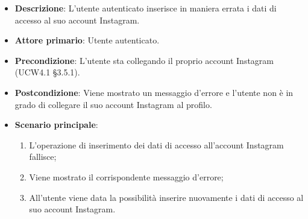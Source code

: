 \begin{itemize}
\item \textbf{Descrizione}: L'utente autenticato inserisce in maniera errata i dati di accesso al suo account Instagram.
\item \textbf{Attore primario}: Utente autenticato.
\item \textbf{Precondizione}: L'utente sta collegando il proprio account Instagram (UCW4.1 §3.5.1).
\item \textbf{Postcondizione}: Viene mostrato un messaggio d'errore e l'utente non è in grado di collegare il suo account Instagram al profilo.

\item \textbf{Scenario principale}:
\begin{enumerate}
\item L'operazione di inserimento dei dati di accesso all'account Instagram fallisce;
\item Viene mostrato il corrispondente messaggio d'errore;
\item All'utente viene data la possibilità inserire nuovamente i dati di accesso al suo account Instagram.
\end{enumerate}
\end{itemize}
